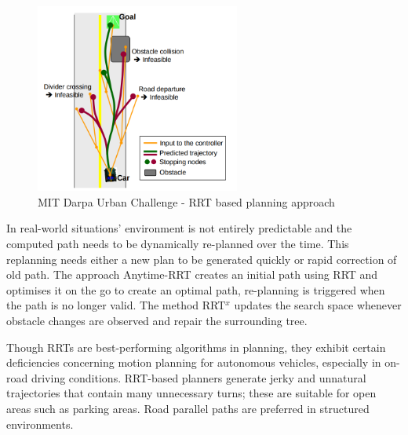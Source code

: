 \begin{figure}
	\centering
	\includegraphics[width=0.6\textwidth]{Images/related_work/mit_urban_planning.png}
	\caption{MIT Darpa Urban Challenge - RRT based planning approach}
	\label{mit_rrt_fig}
\end{figure} 

In real-world situations' environment is not entirely predictable and the computed path needs to be dynamically re-planned over the time. This replanning needs either a new plan to be generated quickly or rapid correction of old path. The approach Anytime-RRT \cite{anytimerrt} creates an initial path using RRT and optimises it on the go to create an optimal path, re-planning is triggered when the path is no longer valid. The method RRT$^x$ \cite{rrtx} updates the search space whenever obstacle changes are observed and repair the surrounding tree. 

Though RRTs are best-performing algorithms in planning, they exhibit certain deficiencies concerning motion planning for autonomous vehicles, especially in on-road driving conditions. RRT-based planners generate jerky and unnatural trajectories that contain many unnecessary turns\cite{improved_rrt}; these are suitable for open areas such as parking areas. Road parallel paths are preferred in structured environments.

